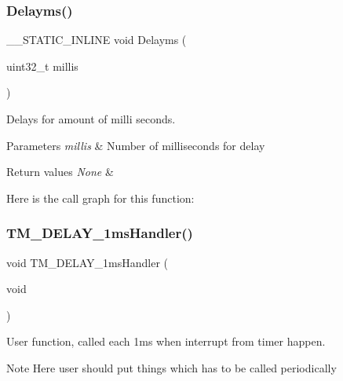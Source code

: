 \subsubsection{\texorpdfstring{Delayms()}{Delayms()}}
{\footnotesize\ttfamily \+\_\+\+\_\+\+S\+T\+A\+T\+I\+C\+\_\+\+I\+N\+L\+I\+NE void Delayms (\begin{DoxyParamCaption}\item[{uint32\+\_\+t}]{millis }\end{DoxyParamCaption})}



Delays for amount of milli seconds. 


\begin{DoxyParams}{Parameters}
{\em millis} & Number of milliseconds for delay \\
\hline
\end{DoxyParams}

\begin{DoxyRetVals}{Return values}
{\em None} & \\
\hline
\end{DoxyRetVals}
Here is the call graph for this function\+:
\mbox{\label{group___t_m___d_e_l_a_y___functions_gadb034c7ca23c2f3f8a3a1a84004860b1}} 
\subsubsection{\texorpdfstring{T\+M\+\_\+\+D\+E\+L\+A\+Y\+\_\+1ms\+Handler()}{TM\_DELAY\_1msHandler()}}
{\footnotesize\ttfamily void T\+M\+\_\+\+D\+E\+L\+A\+Y\+\_\+1ms\+Handler (\begin{DoxyParamCaption}\item[{void}]{ }\end{DoxyParamCaption})}



User function, called each 1ms when interrupt from timer happen. 

\begin{DoxyNote}{Note}
Here user should put things which has to be called periodically 
\end{DoxyNote}

